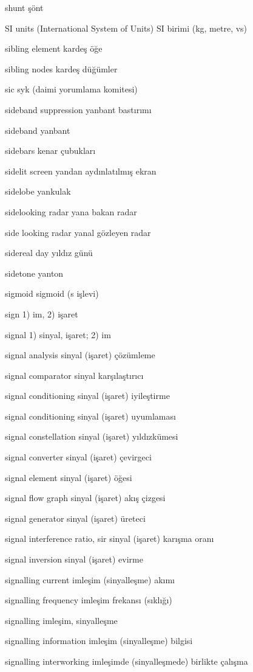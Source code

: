\documentclass[12pt,fleqn]{article}\usepackage{../../common}
\begin{document}
shunt şönt

SI units (International System of Units) SI birimi (kg, metre, vs)

sibling element kardeş öğe

sibling nodes kardeş düğümler

sic syk (daimi yorumlama komitesi)

sideband suppression yanbant bastırımı

sideband yanbant

sidebars kenar çubukları

sidelit screen yandan aydınlatılmış ekran

sidelobe yankulak

sidelooking radar yana bakan radar

side looking radar yanal gözleyen radar

sidereal day yıldız günü

sidetone yanton

sigmoid sigmoid (s işlevi)

sign 1) im, 2) işaret

signal 1) sinyal, işaret; 2) im

signal analysis sinyal (işaret) çözümleme

signal comparator sinyal karşılaştırıcı

signal conditioning sinyal (işaret) iyileştirme

signal conditioning sinyal (işaret) uyumlaması

signal constellation sinyal (işaret) yıldızkümesi

signal converter sinyal (işaret) çevirgeci

signal element sinyal (işaret) öğesi

signal flow graph sinyal (işaret) akış çizgesi

signal generator sinyal (işaret) üreteci

signal interference ratio, sir sinyal (işaret) karışma oranı

signal inversion sinyal (işaret) evirme

signalling current imleşim (sinyalleşme) akımı

signalling frequency imleşim frekansı (sıklığı)

signalling imleşim, sinyalleşme

signalling information imleşim (sinyalleşme) bilgisi

signalling interworking imleşimde (sinyalleşmede) birlikte çalışma
\end{document}

